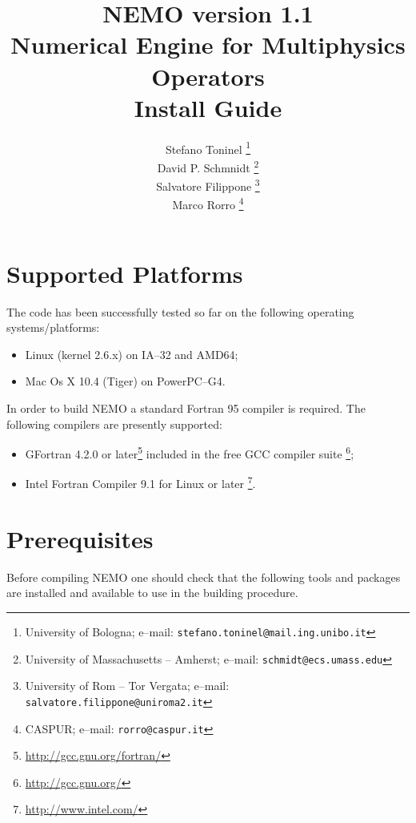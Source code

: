 \documentclass[a4paper,12pt]{article}%
\author{Stefano
  Toninel \thanks{University of Bologna; e--mail:
    \texttt{stefano.toninel@mail.ing.unibo.it}}\\
  David P. Schmnidt \thanks{University of Massachusetts -- Amherst;
    e--mail: \texttt{schmidt@ecs.umass.edu}}\\ 
  Salvatore Filippone \thanks{ University of Rom -- Tor Vergata;
    e--mail: \texttt{salvatore.filippone@uniroma2.it}} \\
  Marco Rorro \thanks{ CASPUR; e--mail: \texttt{rorro@caspur.it}}
}
\title{
  NEMO version 1.1\\
  Numerical Engine for Multiphysics Operators\\
  \bigskip
  Install Guide
}
\begin{document}
\maketitle
\newpage
\tableofcontents
\newpage

\section{Supported Platforms}
The code has been successfully tested so far on the following
operating systems/platforms:
\begin{itemize}
\item Linux (kernel 2.6.x) on IA--32 and AMD64;
\item Mac Os X 10.4 (Tiger) on PowerPC--G4.
\end{itemize}

In order to build NEMO a standard Fortran 95 compiler is required. The
following compilers are presently supported:
\begin{itemize}
\item GFortran 4.2.0 or later\footnote{\url{http://gcc.gnu.org/fortran/}}
  included in the free GCC compiler suite
  \footnote{\url{http://gcc.gnu.org/}}; 
\item Intel Fortran Compiler 9.1 for Linux or later
  \footnote{\url{http://www.intel.com/}}.
\end{itemize}


\section{Prerequisites}

Before compiling NEMO one should check that the following tools and
packages are installed and available to use in the building procedure.
\end{document}
